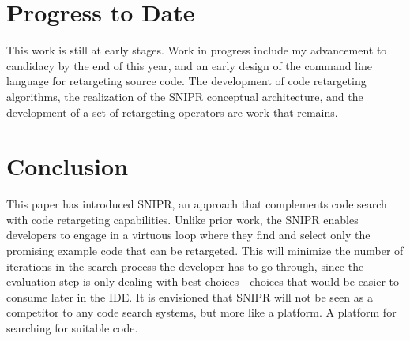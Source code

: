 \documentclass[conference]{IEEEtran}
\begin{document}
\section{Progress to Date}
\label{sec:progress}
This work is still at early stages. Work in progress include my advancement to candidacy by the end of this year, and an early design of the command line language for retargeting source code. The development of code retargeting algorithms, the realization of the \uppercase{SnipR} conceptual architecture, and the development of a set of retargeting operators are work that remains.

\section{Conclusion}
\label{sec:conclude}
This paper has introduced \uppercase{SnipR}, an approach that complements code search with code retargeting capabilities. Unlike prior work, the \uppercase{SnipR} enables developers to engage in a virtuous loop where they find and select only the promising example code that can be retargeted. This will minimize the number of iterations in the search process the developer has to go through, since the evaluation step is only dealing with best choices---choices that would be easier to consume later in the IDE. It is envisioned that \uppercase{SnipR} will not be seen as a competitor to any code search systems, but more like a platform. A platform for searching for suitable code.




%
	
\end{document}
